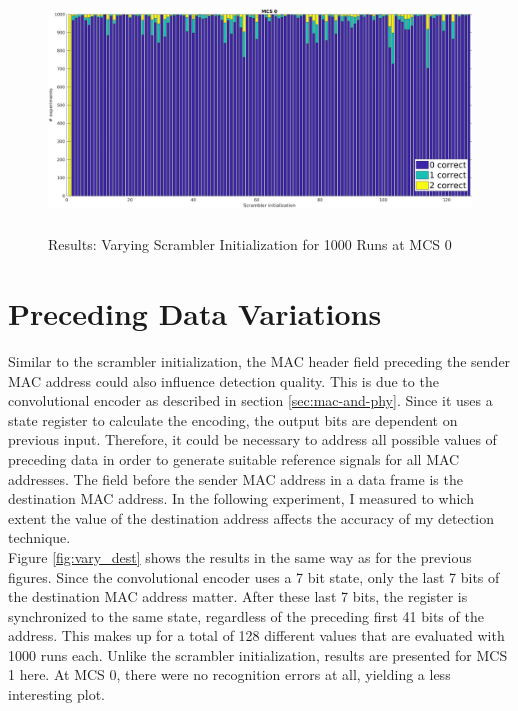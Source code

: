 \begin{figure}[H]
	\centering
	\includegraphics[height=6.5cm]{gfx/plots/scrambler}
	\caption[Results: Varying Scrambler Initialization for 1000 Runs]{Results: Varying Scrambler Initialization for 1000 Runs at MCS 0}
	\label{fig:vary_scrambler}
\end{figure}



\section{Preceding Data Variations}\label{sec:ex-destination}

Similar to the scrambler initialization, the \gls{MAC} header field preceding the sender \gls{MAC} address could also influence detection quality. This is due to the convolutional encoder as described in section \ref{sec:mac-and-phy}. Since it uses a state register to calculate the encoding, the output bits are dependent on previous input. Therefore, it could be necessary to address all possible values of preceding data in order to generate suitable reference signals for all MAC addresses. The field before the sender \gls{MAC} address in a data frame is the destination \gls{MAC} address. In the following experiment, I measured to which extent the value of the destination address affects the accuracy of my detection technique.\\

Figure \ref{fig:vary_dest} shows the results in the same way as for the previous figures. Since the convolutional encoder uses a 7 bit state, only the last 7 bits of the destination \gls{MAC} address matter. After these last 7 bits, the register is synchronized to the same state, regardless of the preceding first 41 bits of the address. This makes up for a total of 128 different values that are evaluated with 1000 runs each. Unlike the scrambler initialization, results are presented for \gls{MCS} 1 here. At \gls{MCS} 0, there were no recognition errors at all, yielding a less interesting plot.

